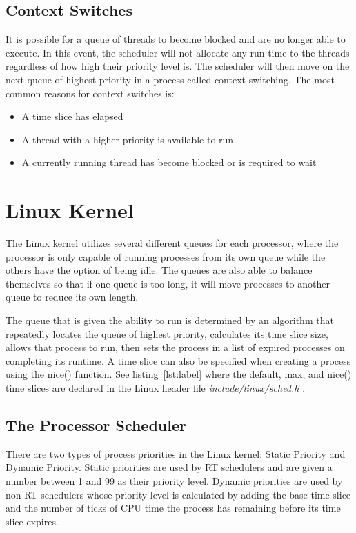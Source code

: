 \documentclass[10pt, draftclsnofoot,onecolumn]{IEEEtran}
\begin{document}
\subsection{Context Switches}

It is possible for a queue of threads to become blocked and are no longer able
to execute. In this event, the scheduler will not allocate any run time to the
threads regardless of how high their priority level is. The scheduler will then
move on the next queue of highest priority in a process called context switching.
The most common reasons for context switches is:
	\begin{itemize}
	  \item A time slice has elapsed
      \item A thread with a higher priority is available to run
      \item A currently running thread has become blocked or is required to wait
	\end{itemize}

\section{Linux Kernel}

The Linux kernel utilizes several different queues for each processor, where the
processor is only capable of running processes from its own queue while the
others have the option of being idle. The queues are also able to balance
themselves so that if one queue is too long, it will move processes to another
queue to reduce its own length. \par
The queue that is given the ability to run is determined by an algorithm that
repeatedly locates the queue of highest priority, calculates its time slice size,
allows that process to run, then sets the process in a list of expired processes
on completing its runtime. A time slice can also be specified when creating a
process using the nice() function. See listing~\ref{lst:label} where the default,
max, and nice() time slices are declared in the Linux header file
\textit{include/linux/sched.h} \cite{2}.

\subsection{The Processor Scheduler}

There are two types of process priorities in the Linux kernel: Static Priority
and Dynamic Priority. Static priorities are used by RT schedulers and are given
a number between 1 and 99 as their priority level. Dynamic priorities are used
by non-RT schedulers whose priority level is calculated by adding the base time
slice and the number of ticks of CPU time the process has remaining before its
time slice expires.
\end{document}
